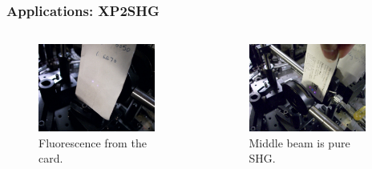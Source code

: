 \documentclass{beamer}
\begin{document}
\begin{frame}
\frametitle{Applications: XP2SHG}
\begin{columns}
\begin{figure}
\includegraphics[width=0.9\textwidth]{image-xp2_01}
\caption{Fluorescence from the card.}
\end{figure}
\begin{figure}
\includegraphics[width=0.9\textwidth]{image-xp2_02}
\caption{Middle beam is pure SHG.}
\end{figure}
\end{columns}
\end{frame}
\end{document}
